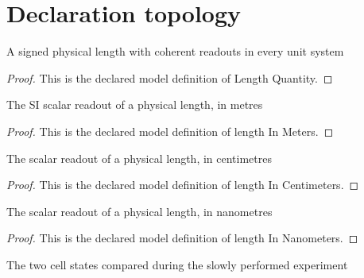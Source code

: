\section{Declaration topology}
\begin{definition}
  \label{def:physics:phyx-mini-0152:phyxminiproblems-problemphyxmini0152-lengthquantity}
  A signed physical length with coherent readouts in every unit system
\end{definition}
\begin{proof}
  This is the declared model definition of Length Quantity.
\end{proof}
\begin{definition}
  \label{def:physics:phyx-mini-0152:phyxminiproblems-problemphyxmini0152-lengthinmeters}
  The SI scalar readout of a physical length, in metres
\end{definition}
\begin{proof}
  This is the declared model definition of length In Meters.
\end{proof}
\begin{definition}
  \label{def:physics:phyx-mini-0152:phyxminiproblems-problemphyxmini0152-lengthincentimeters}
  The scalar readout of a physical length, in centimetres
\end{definition}
\begin{proof}
  This is the declared model definition of length In Centimeters.
\end{proof}
\begin{definition}
  \label{def:physics:phyx-mini-0152:phyxminiproblems-problemphyxmini0152-lengthinnanometers}
  The scalar readout of a physical length, in nanometres
\end{definition}
\begin{proof}
  This is the declared model definition of length In Nanometers.
\end{proof}
\begin{definition}
  \label{def:physics:phyx-mini-0152:phyxminiproblems-problemphyxmini0152-cellstate}
  The two cell states compared during the slowly performed experiment
\end{definition}
